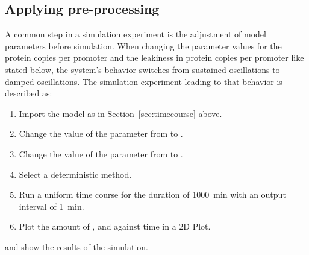 \subsection{Applying pre-processing}
\label{sec:preprocessing}
A common step in a simulation experiment is the adjustment of model parameters before simulation. When changing the parameter values for the protein copies per promoter  and the leakiness in protein copies per promoter  like stated below, the system's behavior switches from sustained oscillations to damped oscillations. The simulation experiment leading to that behavior is described as: 

\begin{enumerate}
	\item{Import the model as in Section~\ref{sec:timecourse} above.}
	\item{Change the value of the parameter  from  to .}
	\item{Change the value of the parameter  from  to .}
	\item{Select a deterministic method.}
	\item{Run a uniform time course for the duration of 1000~min with an output interval of 1~min.}
	\item Plot the amount of ,  and  against time in a 2D Plot.
\end{enumerate}

 and  show the results of the simulation.

